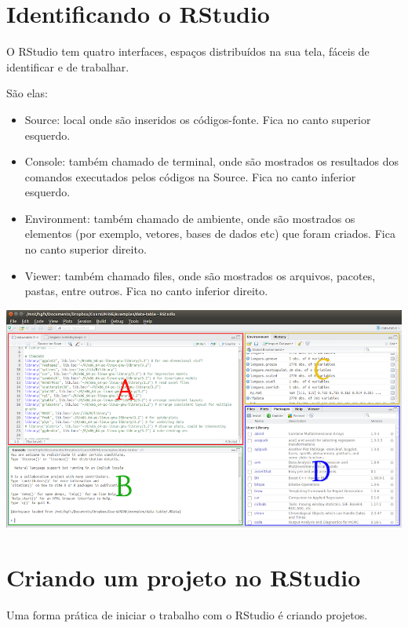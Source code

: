 \documentclass[
  10pt,
  brazil,
  a4paper,
  twoside, notitlepage, openright]{book}
\providecommand{\tightlist}{%
  \setlength{\itemsep}{0pt}\setlength{\parskip}{0pt}}
\begin{document}
\hypertarget{identificando-o-rstudio}{%
\section{Identificando o RStudio}\label{identificando-o-rstudio}}

O RStudio tem quatro interfaces, espaços distribuídos na sua tela, fáceis de identificar e de trabalhar.

São elas:

\begin{itemize}
\tightlist
\item
  Source: local onde são inseridos os códigos-fonte. Fica no canto superior esquerdo.
\item
  Console: também chamado de terminal, onde são mostrados os resultados dos comandos executados pelos códigos na Source. Fica no canto inferior esquerdo.
\item
  Environment: também chamado de ambiente, onde são mostrados os elementos (por exemplo, vetores, bases de dados etc) que foram criados. Fica no canto superior direito.
\item
  Viewer: também chamado files, onde são mostrados os arquivos, pacotes, pastas, entre outros. Fica no canto inferior direito.
\end{itemize}

\includegraphics[width=13.54in]{img/cozinha}

\hypertarget{criando-um-projeto-no-rstudio}{%
\section{Criando um projeto no RStudio}\label{criando-um-projeto-no-rstudio}}

Uma forma prática de iniciar o trabalho com o RStudio é criando projetos.
\end{document}
